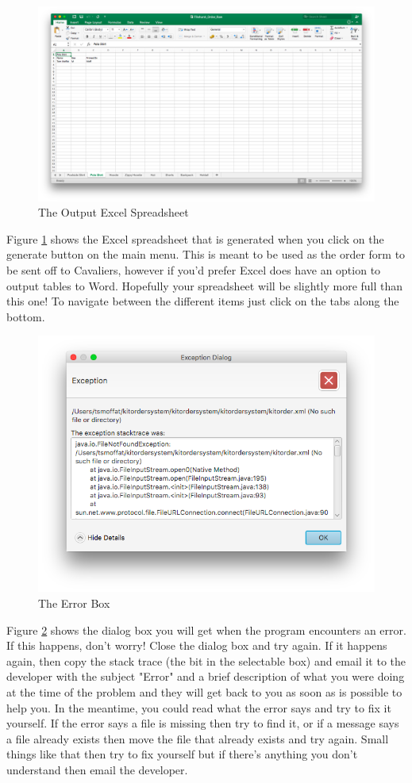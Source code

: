 \documentclass[11pt]{report}
\begin{document}
	\begin{figure}[H]
		\centering
		\includegraphics[width=\textwidth]{OutputExcel}
		\caption{The Output Excel Spreadsheet}
		\label{oe}
	\end{figure}
	Figure \ref{oe} shows the Excel spreadsheet that is generated when you click on the generate button on the main menu. This is meant to be used as the order form to be sent off to Cavaliers, however if you'd prefer Excel does have an option to output tables to Word. Hopefully your spreadsheet will be slightly more full than this one! To navigate between the different items just click on the tabs along the bottom.
	\begin{figure}[H]
		\centering
		\includegraphics[width=\textwidth]{JavaUpdatedError}
		\caption{The Error Box}
		\label{jue}
	\end{figure}
	Figure \ref{jue} shows the dialog box you will get when the program encounters an error. If this happens, don't worry! Close the dialog box and try again. If it happens again, then copy the stack trace (the bit in the selectable box) and email it to the developer with the subject "Error" and a brief description of what you were doing at the time of the problem and they will get back to you as soon as is possible to help you. In the meantime, you could read what the error says and try to fix it yourself. If the error says a file is missing then try to find it, or if a message says a file already exists then move the file that already exists and try again. Small things like that then try to fix yourself but if there's anything you don't understand then email the developer.
\end{document}
